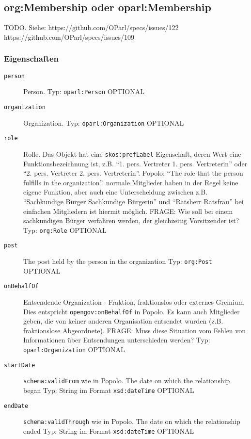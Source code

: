 \documentclass[,a4paper]{article}
\begin{document}
\subsection{org:Membership oder
oparl:Membership}\label{oparlux5fmembership}

TODO. Siehe: https://github.com/OParl/specs/issues/122
https://github.com/OParl/specs/issues/109

\subsubsection{Eigenschaften}\label{eigenschaften-10}

\begin{description}
\item[\texttt{person}]
Person. Typ: \texttt{oparl:Person} OPTIONAL
\item[\texttt{organization}]
Organization. Typ: \texttt{oparl:Organization} OPTIONAL
\item[\texttt{role}]
Rolle. Das Objekt hat eine \texttt{skos:prefLabel}-Eigenschaft, deren
Wert eine Funktionsbezeichnung ist, z.B. ``1. pers. Vertreter \textbar{}
1. pers. Vertreterin'' oder ``2. pers. Vertreter \textbar{} 2. pers.
Vertreterin''. Popolo: ``The role that the person fulfills in the
organization''. normale Mitglieder haben in der Regel keine eigene
Funktion, aber auch eine Unterscheidung zwischen z.B. ``Sachkundige
Bürger \textbar{} Sachkundige Bürgerin'' und ``Ratsherr \textbar{}
Ratsfrau'' bei einfachen Mitgliedern ist hiermit möglich. FRAGE: Wie
soll bei einem sachkundigen Bürger verfahren werden, der gleichzeitig
Vorsitzender ist? Typ: \texttt{org:Role} OPTIONAL
\item[\texttt{post}]
The post held by the person in the organization Typ: \texttt{org:Post}
OPTIONAL
\item[\texttt{onBehalfOf}]
Entsendende Organization - Fraktion, fraktionslos oder externes Gremium
Dies entspricht \texttt{opengov:onBehalfOf} in Popolo. Es kann auch
Mitglieder geben, die von keiner anderen Organisation entsendet wurden
(z.B. fraktionslose Abgeordnete). FRAGE: Muss diese Situation vom Fehlen
von Informationen über Entsendungen unterschieden werden? Typ:
\texttt{oparl:Organization} OPTIONAL
\item[\texttt{startDate}]
\texttt{schema:validFrom} wie in Popolo. The date on which the
relationship began Typ: String im Format \texttt{xsd:dateTime} OPTIONAL
\item[\texttt{endDate}]
\texttt{schema:validThrough} wie in Popolo. The date on which the
relationship ended Typ: String im Format \texttt{xsd:dateTime} OPTIONAL
\end{description}
\end{document}
